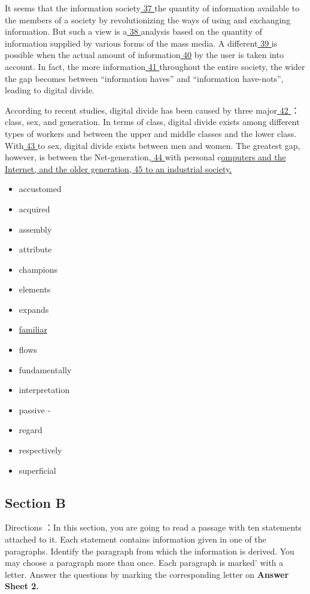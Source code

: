 \documentclass[UTF8,11pt]{ctexart}
\begin{document}
It seems that the information society\uline{ 37 }the quantity of information available to the members of a society by revolutionizing the ways of using and exchanging information. But such a view is a\uline{ 38 }analysis based on the quantity of information supplied by various forms of the mass media. A different\uline{ 39 }is possible when the actual amount of information\uline{ 40} by the user is taken into account. In fact, the more information\uline{ 41 }throughout the entire society, the wider the gap becomes between “information haves” and “information have-nots”, leading to digital divide.


According to recent studies, digital divide has been caused by three major\uline{ 42 }：class, sex, and generation. In terms of class, digital divide exists among different types of workers and between the upper and middle classes and the lower class. With\uline{ 43 }to sex, digital divide exists between men and women. The greatest gap, however, is between the Net-generation,\uline{ 44 }with personal c\uline{omputers and the Internet, and the older generation, 45 to an industrial society.}


\begin{itemize}[leftmargin=2em,itemsep=.2em,topsep=.4em]\item[A.] accustomed
\item[B.] acquired
\item[C.] assembly
\item[D.] attribute
\item[E.] champions
\item[F.] elements
\item[G.] expands
\item[H.] \uline{familiar}
\item[I.] flows
\item[J.] fundamentally
\item[K.] interpretation
\item[L.] passive -
\item[M.] regard
\item[N.] respectively
\item[O.] superficial
\end{itemize}

\subsection*{\textbf{Section B}}


Directions ：In this section, you are going to read a passage with ten statements attached to it. Each statement contains information given in one of the paragraphs. Identify the paragraph from which the information is derived. You may choose a paragraph more than once. Each paragraph is marked' with a letter. Answer the questions by marking the corresponding letter on\textbf{ Answer Sheet 2.}
\end{document}

